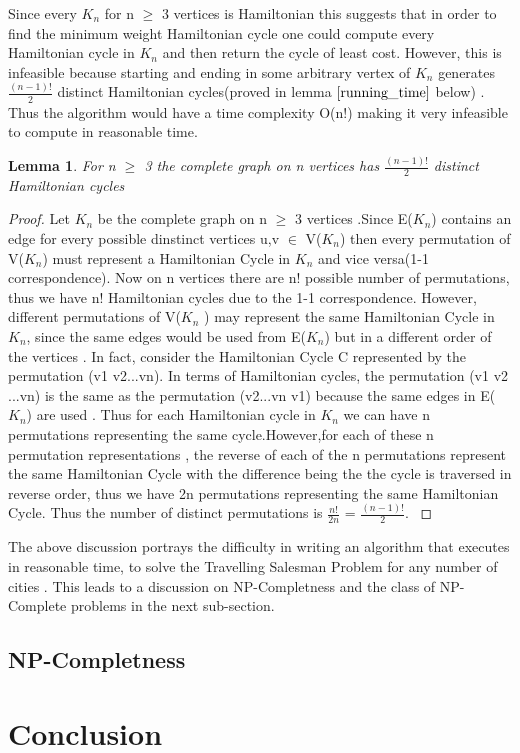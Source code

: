 \documentclass{article}
\newtheorem{lemma}[definition]{Lemma}
\begin{document}
Since every $K_n$ for n $\geq$ 3 vertices is Hamiltonian this suggests that in order to find the minimum weight Hamiltonian cycle one could compute every Hamiltonian cycle in $K_n$ and then return the cycle of least cost. However, this is infeasible because starting and ending in some arbitrary vertex of $K_n$ generates $\frac{(n-1)!}{2}$ distinct Hamiltonian cycles(proved in  lemma $\ref{running_time}$ below) . Thus the algorithm would have a time complexity O(n!) making it very infeasible to compute in reasonable time.\cite{geeksforgeeks_2018}
\begin{lemma}
\label{running_time}
For n $\geq$ 3 the complete graph on n vertices has $\frac{(n-1)!}{2}$ distinct Hamiltonian cycles
\end{lemma}
\begin{proof}
Let $K_n$ be the complete graph on n $\geq$ 3 vertices .Since E($K_n$) contains an edge for every possible dinstinct vertices u,v $\in$ V($K_n$) then every permutation of V($K_n$) must represent a Hamiltonian Cycle in $K_n$ and vice versa(1-1 correspondence). Now on n vertices there are n! possible number of permutations, thus we have n! Hamiltonian cycles due to the 1-1 correspondence. However, different permutations of V($K_n$ ) may represent the same Hamiltonian Cycle in $K_n$, since the same edges would be used from E($K_n$) but in a different order of the vertices . In fact, consider the Hamiltonian Cycle C represented by the permutation (v1 v2...vn). In terms of Hamiltonian cycles, the permutation (v1 v2 ...vn) is the same as the permutation (v2...vn v1) because the same edges in E($K_n$) are used . Thus for each Hamiltonian cycle in $K_n$ we can have n permutations representing the same cycle.However,for each of these n permutation representations , the reverse of each of the n permutations represent the same Hamiltonian Cycle with the difference being the the cycle is traversed in reverse order, thus we have 2n permutations representing the same Hamiltonian Cycle. Thus the number of distinct permutations is $\frac{n!}{2n}$ = $\frac{(n-1)!}{2}$. \cite{mathematics_stack_exchange_2012}
\end{proof}
The above discussion portrays the difficulty in writing an algorithm that executes in reasonable time, to solve the Travelling Salesman Problem for any number of cities . This leads to a discussion on NP-Completness and the class of NP-Complete problems in the next sub-section. 
\subsection{NP-Completness}
\newpage
\section{Conclusion}
\newpage


\end{document}
